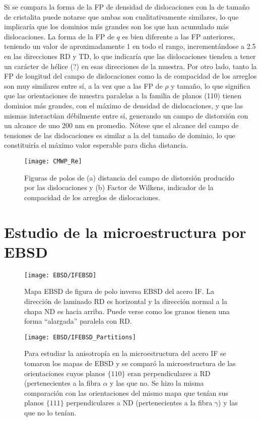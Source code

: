 Si se compara la forma de la FP de densidad de dislocaciones con la de tamaño de cristalita puede notarse que ambas son cualitativamente similares, lo que implicaría que los dominios más grandes son los que han acumulado más dislocaciones.
La forma de la FP de $q$ es bien diferente a las FP anteriores, teniendo un valor de aproximadamente 1 en todo el rango, incrementándose a 2.5 en las direcciones RD y TD, lo que indicaría que las dislocaciones tienden a tener un carácter de hélice (?) en esas direcciones de la muestra.
Por otro lado, tanto la FP de longitud del campo de dislocaciones como la de compacidad de los arreglos son muy similares entre sí, a la vez que a las FP de $\rho$ y tamaño, lo que significa que las orientaciones de muestra paralelas a la familia de planos (110) tienen dominios más grandes, con el máximo de densidad de dislocaciones, y que las mismas interactúan débilmente entre sí, generando un campo de distorsión con un alcance de uno 200 nm en promedio. Nótese que el alcance del campo de tensiones de las dislocaciones es similar a la del tamaño de dominio, lo que constituiría el máximo valor esperable para dicha distancia.

\begin{figure}[!htb]
  \centering
  \texttt{[image: CMWP\_Re]}
  \caption{Figuras de polos de (a) distancia del campo de distorsión producido por las dislocaciones y (b) Factor de Wilkens, indicador de la compacidad de los arreglos de dislocaciones.}
  \label{fig:IFCMWPRe}
\end{figure}

\section{Estudio de la microestructura por EBSD}\label{S:IFEBSD}

\begin{figure}[!htb]
  \centering
  \texttt{[image: EBSD/IFEBSD]}
  \caption{Mapa EBSD de figura de polo inversa EBSD del acero IF. La dirección de laminado RD es horizontal y la dirección normal a la chapa ND es hacia arriba. Puede verse como los granos tienen una forma ``alargada'' paralela con RD.}
  \label{fig:IFEBSD}
\end{figure}

\begin{figure}[!htb]
  \centering
  \texttt{[image: EBSD/IFEBSD\_Partitions]}
  \caption{Para estudiar la anisotropía en la microestructura del acero IF se tomaron los mapas de EBSD y se comparó la microestructura de las orientaciones cuyos planos $\{110\}$ eran perpendiculares a RD (pertenecientes a la fibra $\alpha$ y las que no. Se hizo la misma comparación con las orientaciones del mismo mapa que tenían sus planos $\{111\}$ perpendiculares a ND (pertenecientes a la fibra $\gamma$) y las que no lo tenían.}
  \label{fig:IFEBSDPar}
\end{figure}

